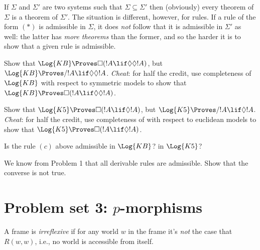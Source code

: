 \documentclass[../../../include/open-logic-section]{subfiles}
\begin{document}
If $\Sigma$ and $\Sigma'$ are two systems such that $\Sigma \subseteq
\Sigma'$ then (obviously) every theorem of $\Sigma$ is a theorem of
$\Sigma'$. The situation is different, however, for rules. If a rule
of the form $(*)$ is admissible in $\Sigma$, it does {\em not} follow
that it is admissible in $\Sigma'$ as well: the latter has {\em more
  theorems} than the former, and so the harder it is to show that a
given rule is admissible.

\begin{problem} [10 points]
  Show that $\Log{KB} \Proves \Box(!A \lif \Diamond\Diamond
  !A)$, but $\Log{KB} \Proves/  !A \lif \Diamond\Diamond
  !A$. \emph{Cheat}: for half the credit, use completeness of
  $\Log{KB}$ with respect to symmetric models to show that
  $\Log{KB} \Proves \Box(!A \lif \Diamond\Diamond !A)$.
\end{problem}


\begin{problem} [10 points]
  Show that $\Log{K5}\Proves \Box(!A \lif \Diamond !A)$,
  but $\Log{K5} \Proves/  !A \lif \Diamond
  !A$. \emph{Cheat}: for half the credit, use completeness of
   with respect to euclidean models to show that
  $\Log{K5} \Proves \Box(!A \lif \Diamond !A)$.
\end{problem}

\begin{problem} [10 points]
  Is the rule $(c)$ above admissible in $\Log{KB}$? in $\Log{K5}$?
\end{problem}


\begin{problem} [10 points]
  We know from Problem 1 that all derivable rules are admissible. Show
  that the converse is not true.
\end{problem}


\section{Problem set 3: $p$-morphisms}
\setcounter{problem}{0}


\begin{definition}
  A frame is \emph{irreflexive} if for any world $w$ in the frame
  it's \emph{not} the case that $R(w,w)$, i.e., no world is accessible
  from itself. 
\end{definition}
\end{document}
